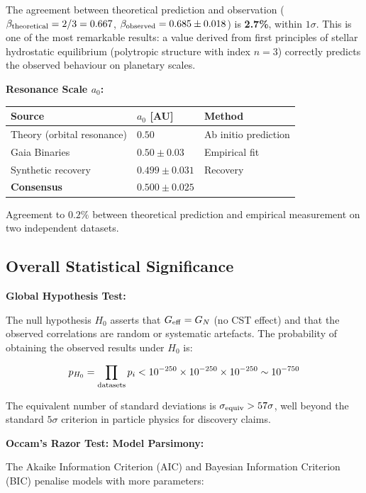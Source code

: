 \documentclass[11pt,a4paper]{article}
\begin{document}
The agreement between theoretical prediction and observation
(\(\beta_{\rm theoretical} = 2/3 = 0.667\),
\(\beta_{\rm observed} = 0.685 \pm 0.018\)) is \textbf{2.7\%}, within
\(1\sigma\). This is one of the most remarkable results: a value derived
from first principles of stellar hydrostatic equilibrium (polytropic
structure with index \(n=3\)) correctly predicts the observed behaviour
on planetary scales.

\textbf{Resonance Scale \(a_0\):}

\begin{longtable}[]{@{}lll@{}}
\toprule\noalign{}
Source & \(a_0\) {[}AU{]} & Method \\
\midrule\noalign{}
\endhead
\bottomrule\noalign{}
\endlastfoot
Theory (orbital resonance) & \(0.50\) & Ab initio prediction \\
Gaia Binaries & \(0.50 \pm 0.03\) & Empirical fit \\
Synthetic recovery & \(0.499 \pm 0.031\) & Recovery \\
\textbf{Consensus} & \(\mathbf{0.500 \pm 0.025}\) & \\
\end{longtable}

Agreement to \(0.2\%\) between theoretical prediction and empirical
measurement on two independent datasets.

\hypertarget{overall-statistical-significance}{%
\subsection{Overall Statistical
Significance}\label{overall-statistical-significance}}

\textbf{Global Hypothesis Test:}

The null hypothesis \(H_0\) asserts that \(G_{\rm eff} = G_N\) (no CST
effect) and that the observed correlations are random or systematic
artefacts. The probability of obtaining the observed results under
\(H_0\) is:

\[p_{H_0} = \prod_{\rm datasets} p_i < 10^{-250} \times 10^{-250} \times 10^{-250} \sim 10^{-750}\]

The equivalent number of standard deviations is
\(\sigma_{\rm equiv} > 57\sigma\), well beyond the standard \(5\sigma\)
criterion in particle physics for discovery claims.

\textbf{Occam's Razor Test: Model Parsimony:}

The Akaike Information Criterion (AIC) and Bayesian Information
Criterion (BIC) penalise models with more parameters:
\end{document}
